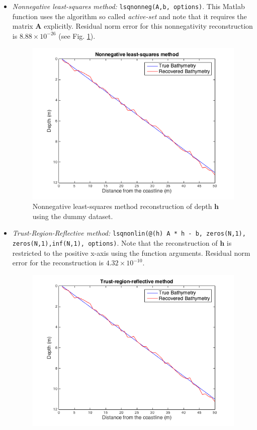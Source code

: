 \begin{itemize}
\item[(1)]  \textit{Nonnegative least-squares method:}  \verb|lsqnonneg(A,b, options)|. This Matlab function uses the algorithm so called \textit{active-set} and note that it requires the matrix $\mathbf{A}$ explicitly. Residual norm error for this nonnegativity reconstruction is $8.88 \times 10^{-26}$ (see Fig. \ref{nonLS_fig}).   \\

\begin{figure}[H]
\center
\includegraphics[scale=0.6]{img/NonLS_linear.png} 
\caption{Nonnegative least-squares method reconstruction of depth $\mathbf{h}$ using the dummy dataset.}
\label{nonLS_fig}
\end{figure}
\item[(2)]  \textit{Trust-Region-Reflective method:}  \verb|lsqnonlin(@(h) A * h - b, zeros(N,1),| \\ \verb|zeros(N,1),inf(N,1), options)|. Note that the reconstruction of $\mathbf{h}$ is restricted to the positive x-axis using the function arguments. Residual norm error for the reconstruction is $4.32 \times 10^{-10}$. 
\begin{figure}[H]
\center
\includegraphics[scale=0.6]{img/trust_region_linear.png} 

\end{figure}
\end{itemize}
